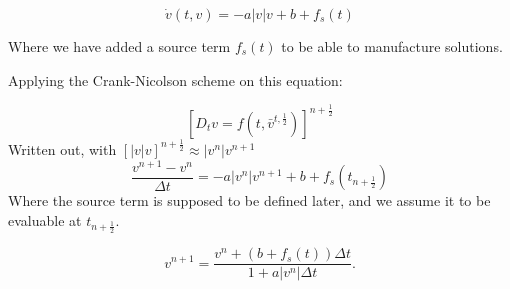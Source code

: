 \documentclass[a4paper, 10pt]{article}
\begin{document}
\begin{equation}
	\dot{v}(t, v) = -a|v|v + b + f_s(t)
\end{equation}

Where we have added a source term $f_s(t)$ to be able to manufacture solutions.

Applying the Crank-Nicolson scheme on this equation:

\begin{equation}
	\left[ D_t v = f(t, \bar{v}^{t, \frac{1}{2}})\right]^{n+\frac{1}{2}}
\end{equation}
Written out, with $[|v|v]^{n+\frac{1}{2}} \approx |v^{n}|v^{n+1}$
\begin{equation}
	\frac{v^{n+1}-v^{n}}{\Delta t} = -a |v^{n}| v^{n+1} + b + f_s(t_{n+\frac{1}{2}})
\end{equation}
Where the source term is supposed to be defined later, and we assume it to be evaluable at $t_{n+\frac{1}{2}}$.

\begin{equation}
	v^{n+1} = \frac{v^n + (b + f_s(t))\Delta t }{1 + a |v^n| \Delta t}.
\end{equation}
\end{document}
